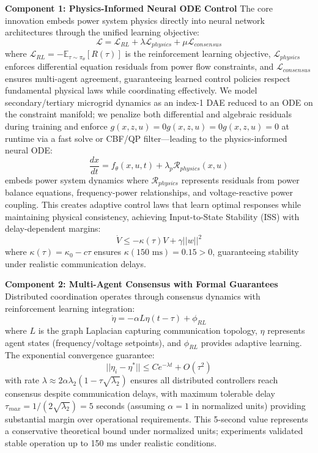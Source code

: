 \documentclass[12pt]{article}
\begin{document}
\textbf{Component 1: Physics-Informed Neural ODE Control}
The core innovation embeds power system physics directly into neural network architectures through the unified learning objective:
$$\mathcal{L} = \mathcal{L}_{RL} + \lambda \mathcal{L}_{physics} + \mu \mathcal{L}_{consensus}$$
where $\mathcal{L}_{RL} = -\mathbb{E}_{\tau \sim \pi_\theta}[R(\tau)]$ is the reinforcement learning objective, $\mathcal{L}_{physics}$ enforces differential equation residuals from power flow constraints, and $\mathcal{L}_{consensus}$ ensures multi-agent agreement, guaranteeing learned control policies respect fundamental physical laws while coordinating effectively. We model secondary/tertiary microgrid dynamics as an index-1 DAE reduced to an ODE on the constraint manifold; we penalize both differential and algebraic residuals during training and enforce $g(x,z,u)=0g(x,z,u)=0g(x,z,u)=0$ at runtime via a fast solve or CBF/QP filter—leading to the physics-informed neural ODE:
$$\frac{dx}{dt} = f_\theta(x, u, t) + \lambda_p \mathcal{R}_{physics}(x, u)$$
embeds power system dynamics where $\mathcal{R}_{physics}$ represents residuals from power balance equations, frequency-power relationships, and voltage-reactive power coupling. This creates adaptive control laws that learn optimal responses while maintaining physical consistency, achieving Input-to-State Stability (ISS) with delay-dependent margins:
$$\dot{V} \leq -\kappa(\tau)V + \gamma||w||^2$$
where $\kappa(\tau) = \kappa_0 - c\tau$ ensures $\kappa(150\text{ ms}) = 0.15 > 0$, guaranteeing stability under realistic communication delays.

\textbf{Component 2: Multi-Agent Consensus with Formal Guarantees}
Distributed coordination operates through consensus dynamics with reinforcement learning integration:
$$\dot{\eta} = -\alpha L \eta(t-\tau) + \phi_{RL}$$
where $L$ is the graph Laplacian capturing communication topology, $\eta$ represents agent states (frequency/voltage setpoints), and $\phi_{RL}$ provides adaptive learning. The exponential convergence guarantee:
$$||\eta_i - \eta^*|| \leq Ce^{-\lambda t} + O(\tau^2)$$
with rate $\lambda \approx 2\alpha\lambda_2(1 - \tau\sqrt{\lambda_2})$ ensures all distributed controllers reach consensus despite communication delays, with maximum tolerable delay $\tau_{max} = 1/(2\sqrt{\lambda_2}) = 5$ seconds (assuming $\alpha = 1$ in normalized units) providing substantial margin over operational requirements. This 5-second value represents a conservative theoretical bound under normalized units; experiments validated stable operation up to 150 ms under realistic conditions.
\end{document}
